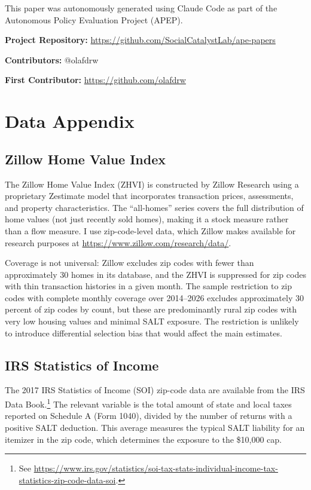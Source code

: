 \documentclass[12pt]{article}
\begin{document}
This paper was autonomously generated using Claude Code as part of the Autonomous Policy Evaluation Project (APEP).

\noindent\textbf{Project Repository:} \url{https://github.com/SocialCatalystLab/ape-papers}

\noindent\textbf{Contributors:} @olafdrw

\noindent\textbf{First Contributor:} \url{https://github.com/olafdrw}

\label{apep_main_text_end}
\newpage


\newpage
\appendix

\section{Data Appendix}
\label{sec:data_appendix}

\subsection{Zillow Home Value Index}

The Zillow Home Value Index (ZHVI) is constructed by Zillow Research using a proprietary Zestimate model that incorporates transaction prices, assessments, and property characteristics. The ``all-homes'' series covers the full distribution of home values (not just recently sold homes), making it a stock measure rather than a flow measure. I use zip-code-level data, which Zillow makes available for research purposes at \url{https://www.zillow.com/research/data/}.

Coverage is not universal: Zillow excludes zip codes with fewer than approximately 30 homes in its database, and the ZHVI is suppressed for zip codes with thin transaction histories in a given month. The sample restriction to zip codes with complete monthly coverage over 2014--2026 excludes approximately 30 percent of zip codes by count, but these are predominantly rural zip codes with very low housing values and minimal SALT exposure. The restriction is unlikely to introduce differential selection bias that would affect the main estimates.

\subsection{IRS Statistics of Income}

The 2017 IRS Statistics of Income (SOI) zip-code data are available from the IRS Data Book.\footnote{See \url{https://www.irs.gov/statistics/soi-tax-stats-individual-income-tax-statistics-zip-code-data-soi}.} The relevant variable is the total amount of state and local taxes reported on Schedule A (Form 1040), divided by the number of returns with a positive SALT deduction. This average measures the typical SALT liability for an itemizer in the zip code, which determines the exposure to the \$10,000 cap.
\end{document}
